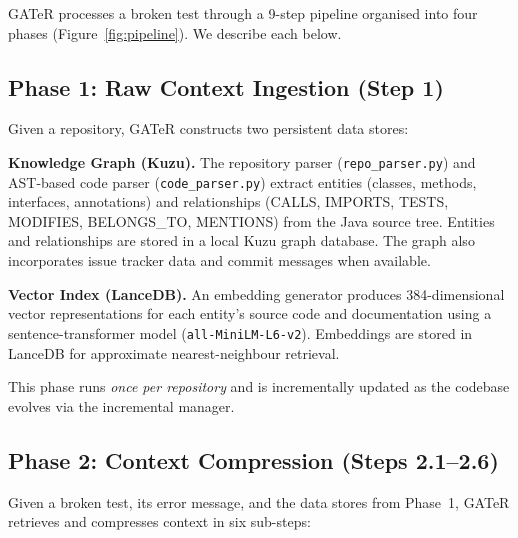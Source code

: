 \documentclass[conference,10pt]{IEEEtran}
\begin{document}
GATeR processes a broken test through a 9-step pipeline organised into
four phases (Figure~\ref{fig:pipeline}). We describe each below.

\subsection{Phase 1: Raw Context Ingestion (Step 1)}

Given a repository, GATeR constructs two persistent data stores:

\noindent\textbf{Knowledge Graph (Kuzu).}
The repository parser (\texttt{repo\_parser.py}) and AST-based code parser
(\texttt{code\_parser.py}) extract entities (classes, methods, interfaces,
annotations) and relationships (CALLS, IMPORTS, TESTS, MODIFIES,
BELONGS\_TO, MENTIONS) from the Java source tree. Entities and
relationships are stored in a local Kuzu graph database. The graph also
incorporates issue tracker data and commit messages when available.

\noindent\textbf{Vector Index (LanceDB).}
An embedding generator produces 384-dimensional vector representations
for each entity's source code and documentation using a
sentence-transformer model (\texttt{all-MiniLM-L6-v2}).
Embeddings are stored in LanceDB for approximate nearest-neighbour
retrieval.

This phase runs \emph{once per repository} and is incrementally updated
as the codebase evolves via the incremental manager.

\subsection{Phase 2: Context Compression (Steps 2.1--2.6)}

Given a broken test, its error message, and the data stores from
Phase~1, GATeR retrieves and compresses context in six sub-steps:
\end{document}
